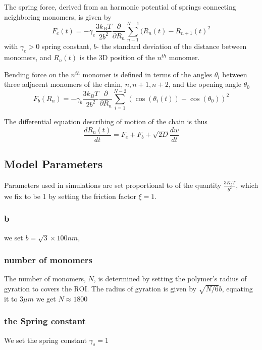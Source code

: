 \documentclass[12pt]{report}
\begin{document}
     The spring force, derived from an harmonic potential of springs connecting neighboring monomers, is given by
     \begin{equation*}
      F_e(t) = -\gamma_e\frac{3k_BT}{2b^2}\frac{\partial}{\partial R_n}\sum_{n-1}^{N-1}(R_n(t)-R_{n+1}(t)^2
     \end{equation*}
     with $\gamma_e>0$ spring constant, $b$- the standard deviation of the distance between monomers, and $R_n(t)$ is the 3D position of the $n^{th}$ monomer.
     
     Bending force on the $n^{th}$ monomer is defined in terms of the angles $\theta_i$ between three adjacent monomers of the chain, $n,n+1,n+2$, and the opening angle $\theta_0$
     \begin{equation*}
     F_b(R_n) = -\gamma_b\frac{3k_BT}{2b^2}\frac{\partial}{\partial R_n}\sum_{i=1}^{N-2}(\cos(\theta_i(t))-\cos(\theta_0))^2
     \end{equation*}
               
     The differential equation describing of motion of the chain is thus 
     \begin{equation*}
     \frac{dR_n(t)}{dt}= F_e +F_b +\sqrt{2D} \frac{dw}{dt}     
     \end{equation*}
     
    \subsection{Model Parameters}
      Parameters used in simulations are set proportional to of the quantity $\frac{3K_bT}{b^2}$, which we fix to be 1 by setting the friction factor $\xi=1$. 
    \subsubsection{b} 
      we set $b=\sqrt{3} \times 100 nm$, 
    \subsubsection{number of monomers}
      The number of monomers, $N$, is determined by setting the polymer's radius of gyration to covers the ROI. The radius of gyration is given by $\sqrt{N/6}b$, equating it to $3\mu m$ we get $N\approx 1800$ 
                     
     \subsubsection{the Spring constant}
       We set the spring constant $\gamma_s =1$
\end{document}
